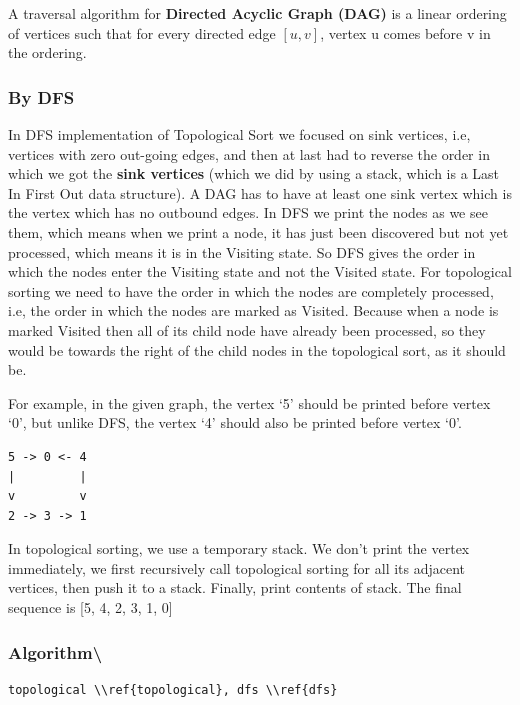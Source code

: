 \documentclass[]{book}
\begin{document}
A traversal algorithm for \textbf{Directed Acyclic Graph (DAG)} is a linear ordering of vertices such that for every
directed edge \([u,v]\), vertex u comes before v in the ordering.

\subsubsection{By DFS}

In DFS implementation of Topological Sort we focused on sink vertices, i.e, vertices with zero out-going edges, and then
at last had to reverse the order in which we got the \textbf{sink vertices} (which we did by using a stack, which is a
Last In First Out data structure). A DAG has to have at least one sink vertex which is the vertex which has no outbound
edges. In DFS we print the nodes as we see them, which means when we print a node, it has just been discovered but not
yet processed, which means it is in the Visiting state. So DFS gives the order in which the nodes enter the Visiting
state and not the Visited state. For topological sorting we need to have the order in which the nodes are completely
processed, i.e, the order in which the nodes are marked as Visited. Because when a node is marked Visited then all of
its child node have already been processed, so they would be towards the right of the child nodes in the topological
sort, as it should be.

For example, in the given graph, the vertex `5' should be printed before vertex `0', but unlike DFS, the vertex `4'
should also be printed before vertex `0'.

\begin{verbatim}
5 -> 0 <- 4
|         |
v         v
2 -> 3 -> 1
\end{verbatim}

In topological sorting, we use a temporary stack. We don't print the vertex immediately, we first recursively call
topological sorting for all its adjacent vertices, then push it to a stack. Finally, print contents of stack. The
final sequence is {[}5, 4, 2, 3, 1, 0{]}

\hypertarget{algorithm-102}{%
\subsubsection{Algorithm\textbackslash{}}\label{algorithm-102}}

\begin{verbatim}
topological \\ref{topological}, dfs \\ref{dfs}
\end{verbatim}
\end{document}
